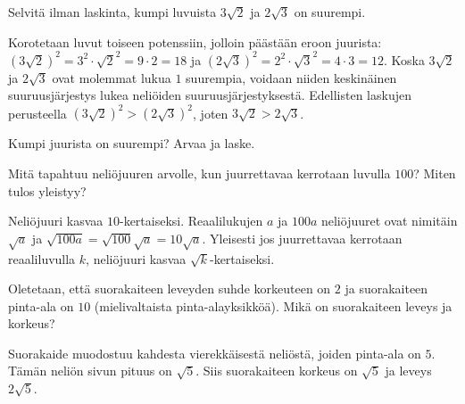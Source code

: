 \begin{tehtavasivu}
\begin{tehtava}
        Selvitä ilman laskinta, kumpi luvuista $3\sqrt{2}$ ja $2\sqrt{3}$ on suurempi. 
        \begin{vastaus}
        Korotetaan luvut toiseen potenssiin, jolloin päästään eroon juurista: $(3\sqrt{2})^2=3^2\cdot\sqrt{2}^2=9 \cdot 2=18$ ja $(2\sqrt{3})^2=2^2\cdot\sqrt{3}^2=4 \cdot 3=12$. Koska $3\sqrt{2}$ ja $2\sqrt{3}$ ovat molemmat lukua $1$ suurempia, voidaan niiden keskinäinen suuruusjärjestys lukea neliöiden suuruusjärjestyksestä. Edellisten laskujen perusteella $(3\sqrt{2})^2 > (2\sqrt{3})^2$, joten $3\sqrt{2} > 2\sqrt{3}$.
        \end{vastaus}
\end{tehtava}

\begin{tehtava} Kumpi juurista on suurempi? Arvaa ja laske.
\begin{vastaus}
\end{vastaus}
\end{tehtava}

\begin{tehtava}
Mitä tapahtuu neliöjuuren arvolle, kun juurrettavaa kerrotaan luvulla $100$? Miten tulos yleistyy?
        \begin{vastaus}
        Neliöjuuri kasvaa $10$-kertaiseksi. Reaalilukujen $a$ ja $100a$ neliöjuuret ovat nimitäin $\sqrt{a}$ ja $\sqrt{100a}=\sqrt{100}\sqrt{a}=10\sqrt{a}$. Yleisesti jos juurrettavaa kerrotaan reaaliluvulla $k$, neliöjuuri kasvaa $\sqrt{k}$-kertaiseksi.
        \end{vastaus}
\end{tehtava}

\begin{tehtava}
Oletetaan, että suorakaiteen leveyden suhde korkeuteen on $2$ ja suorakaiteen pinta-ala on $10$ (mielivaltaista pinta-alayksikköä). Mikä on suorakaiteen leveys ja korkeus?
\begin{vastaus}
Suorakaide muodostuu kahdesta vierekkäisestä neliöstä, joiden pinta-ala on $5$. Tämän neliön sivun pituus on $\sqrt{5}$. Siis suorakaiteen korkeus on $\sqrt{5}$ ja leveys $2\sqrt{5}$.
\end{vastaus}
\end{tehtava}


\end{tehtavasivu}
